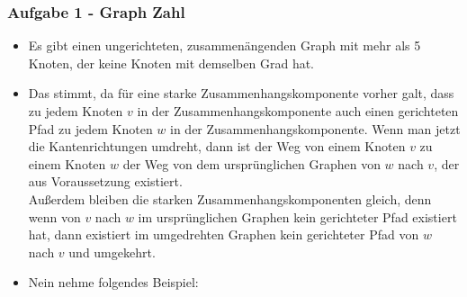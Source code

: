 \documentclass[11pt]{scrartcl}
\newcommand{\task}[1]{\subsubsection*{#1}}
\begin{document}
\task{Aufgabe 1 - Graph Zahl}
\begin{itemize}
	\item Es gibt einen ungerichteten, zusammenängenden Graph mit mehr als 5 Knoten, der keine Knoten mit demselben Grad hat.\\[2ex]
	\item Das stimmt, da für eine starke Zusammenhangskomponente vorher galt, dass zu jedem Knoten $ v $ in der Zusammenhangskomponente auch einen gerichteten Pfad zu jedem Knoten $ w $ in der Zusammenhangskomponente. Wenn man jetzt die Kantenrichtungen umdreht, dann ist der Weg von einem Knoten $ v $ zu einem Knoten $ w $ der Weg von dem ursprünglichen Graphen von $ w $ nach $ v $, der aus Voraussetzung existiert.\\
		Außerdem bleiben die starken Zusammenhangskomponenten gleich, denn wenn von $ v $ nach $ w $ im ursprünglichen Graphen kein gerichteter Pfad existiert hat, dann existiert im umgedrehten Graphen kein gerichteter Pfad von $ w $ nach $ v $ und umgekehrt.
	\item Nein nehme folgendes Beispiel: \\[2ex]
\end{itemize}
\end{document}

